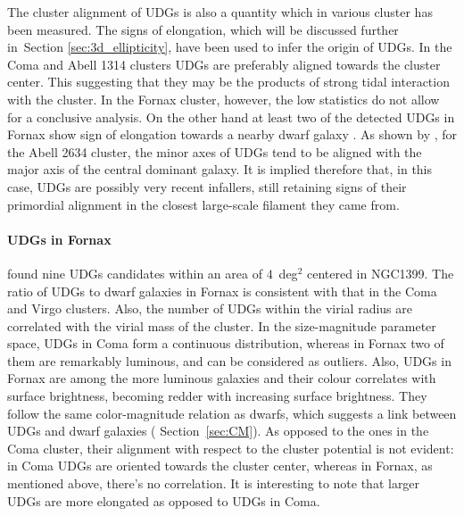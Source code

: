 The cluster alignment of UDGs is also a quantity which in various cluster has been measured.
The signs of elongation, which will be discussed further in~Section \ref{sec:3d_ellipticity}, have been used to infer the origin of UDGs.
In the Coma and Abell 1314 clusters \citep{Yagi2016, ManceraPina2019} UDGs are preferably aligned towards the cluster center.
This suggesting that they may be the products of strong tidal interaction with the cluster.
In the Fornax cluster, however, the low statistics do not allow for a conclusive analysis.
On the other hand at least two of the detected UDGs in Fornax show sign of elongation towards a nearby dwarf galaxy \citep[with $M_{r'} > -19$~mag, see][]{Venhola2017}.
As shown by \citet{Rong2020}, for the Abell 2634 cluster, the minor axes of UDGs tend to be aligned with the major axis of the central dominant galaxy.
It is implied therefore that, in this case, UDGs are possibly very recent infallers, still retaining signs of their primordial alignment in the closest large-scale filament they came from.

\paragraph{UDGs in Fornax}
\citet{Venhola2017} found nine UDGs candidates within an area of $4$~deg$^2$ centered in NGC1399.
The ratio of UDGs to dwarf galaxies in Fornax is consistent with that in the Coma and Virgo clusters.
Also, the number of UDGs within the virial radius are correlated with the virial mass of the cluster.
In the size-magnitude parameter space, UDGs in Coma form a continuous distribution, whereas in Fornax two of them are  remarkably luminous, and can be considered as outliers.
Also, UDGs in Fornax are among the more luminous galaxies and their colour correlates with surface brightness, becoming redder with increasing surface brightness.
They follow the same color-magnitude relation as dwarfs, which suggests a link between UDGs and dwarf galaxies  (\cf{} Section~\ref{sec:CM}).
As opposed to the ones in the Coma cluster, their alignment with respect to the cluster potential is not evident: in Coma UDGs are oriented towards the cluster center, whereas in Fornax, as mentioned above, there's no correlation.
It is interesting to note that larger UDGs are more elongated as opposed to UDGs in Coma.

